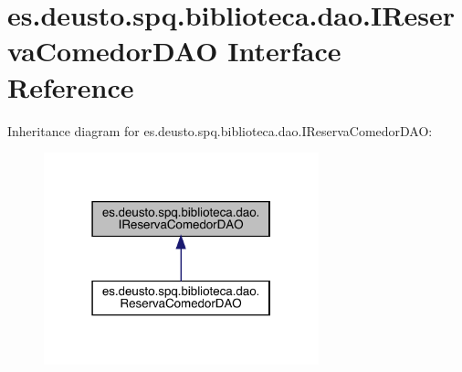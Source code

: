 \hypertarget{interfacees_1_1deusto_1_1spq_1_1biblioteca_1_1dao_1_1_i_reserva_comedor_d_a_o}{}\section{es.\+deusto.\+spq.\+biblioteca.\+dao.\+I\+Reserva\+Comedor\+D\+AO Interface Reference}
\label{interfacees_1_1deusto_1_1spq_1_1biblioteca_1_1dao_1_1_i_reserva_comedor_d_a_o}


Inheritance diagram for es.\+deusto.\+spq.\+biblioteca.\+dao.\+I\+Reserva\+Comedor\+D\+AO\+:
\nopagebreak
\begin{figure}[H]
\begin{center}
\leavevmode
\includegraphics[width=226pt]{interfacees_1_1deusto_1_1spq_1_1biblioteca_1_1dao_1_1_i_reserva_comedor_d_a_o__inherit__graph}
\end{center}
\end{figure}
